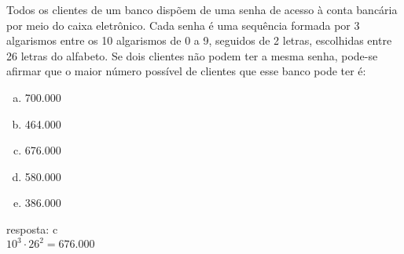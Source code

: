 \begin{ex}
Todos os clientes de um banco dispõem de uma senha de acesso à conta bancária por meio do caixa eletrônico. Cada senha é uma sequência formada por 3 algarismos entre os 10 algarismos de 0 a 9, seguidos de 2 letras, escolhidas entre 26 letras do alfabeto. Se dois clientes não podem ter a mesma senha, pode-se afirmar que o maior número possível de clientes que esse banco pode ter é:
   \begin{enumerate}[(a)]
   \item 700.000
   \item 464.000
   \item 676.000
   \item 580.000
   \item 386.000
   \end{enumerate}
     \begin{sol}
     resposta:  c\\
     $10^3\cdot26^2=676.000$
     \end{sol}
\end{ex}